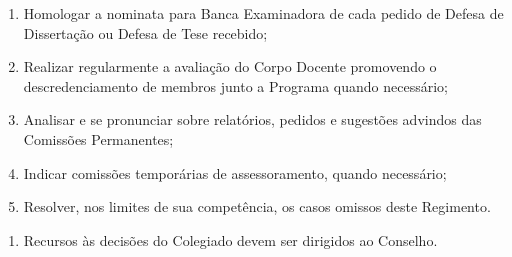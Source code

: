 \documentclass{article}
\newcommand{\singleitem}{\item[Parágrafo Único.]}
\newcommand{\grupoMenor}{Colegiado\xspace}
\newcommand{\grupoMaior}{Conselho\xspace}
\begin{document}
\begin{enumerate}
\begin{enumerate}[label=\Roman*]
		\item Homologar a nominata para Banca Examinadora de cada pedido de Defesa de Dissertação ou Defesa de Tese recebido;
		\item Realizar regularmente a avaliação do Corpo Docente promovendo o descredenciamento de membros junto a Programa quando necessário;
		\item Analisar e se pronunciar sobre relatórios, pedidos e sugestões advindos das Comissões Permanentes;
		\item Indicar comissões temporárias de assessoramento, quando necessário;
		\item Resolver, nos limites de sua competência, os casos omissos deste Regimento.
	\end{enumerate}

	\begin{enumerate}
		\singleitem Recursos às decisões do \grupoMenor devem ser dirigidos ao \grupoMaior.
	\end{enumerate}
\end{enumerate}
\end{document}
